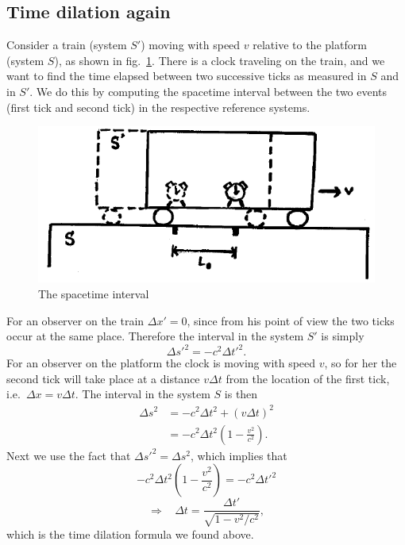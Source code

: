 \documentclass[11pt, a4paper,oneside,openright]{book}
\numberwithin{equation}{section}
\begin{document}
\subsection{Time dilation again}

Consider a train (system $S'$) moving with speed $v$ relative to the platform (system $S$), as shown in fig.\ \ref{fig:lec2_5}. There is a clock traveling on the train, and we want to find the time elapsed between two successive ticks as measured in $S$ and in $S'$. We do this by computing the spacetime interval between the two events (first tick and second tick) in the respective reference systems.
\begin{figure}[ht]
\begin{center}
\includegraphics[scale=0.6]{Draw/lec2_5.png}
\end{center}
\caption{The spacetime interval}
\label{fig:lec2_5}
\end{figure}

For an observer on the train $\Delta x'=0$, since from his point of view the two ticks occur at the same place. Therefore the interval in the system $S'$ is simply
\begin{equation}
\Delta s'^2=-c^2\Delta t'^2.
\end{equation}
For an observer on the platform the clock is moving with speed $v$, so for her the second tick will take place at a distance $v\Delta t$ from the location of the first tick, i.e.\ $\Delta x=v\Delta t$. The interval in the system $S$ is then
\begin{equation}
\begin{split}
\Delta s^2&=-c^2\Delta t^2+(v\Delta t)^2\\
&=-c^2\Delta t^2\left(1-\frac{v^2}{c^2}\right).
\end{split}
\end{equation}
Next we use the fact that $\Delta s'^2=\Delta s^2$, which implies that
\begin{equation}
-c^2\Delta t^2\left(1-\frac{v^2}{c^2}\right)=-c^2\Delta t'^2
\end{equation}
\begin{equation}
\Rightarrow~~~~\Delta t=\frac{\Delta t'}{\sqrt{1-v^2/c^2}},
\end{equation}
which is the time dilation formula we found above.
\end{document}
